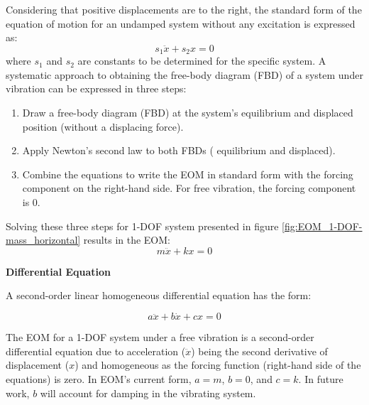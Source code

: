 \documentclass[12pt,letter]{article}
\begin{document}
		\pagebreak
		Considering that positive displacements are to the right, the standard form of the equation of motion for an undamped system without any excitation is expressed as:  
		\begin{equation}
			s_1 \ddot{x} + s_2 x = 0
		\end{equation}			
		where $s_1$ and $s_2$ are constants to be determined for the specific system. A systematic approach to obtaining the free-body diagram (FBD) of a system under vibration can be expressed in three steps:
		\begin{enumerate}
			\item Draw a free-body diagram (FBD) at the system's equilibrium and displaced position (without a displacing force).
			\item Apply Newton's second law to both FBDs ( equilibrium and displaced).
			\item Combine the equations to write the EOM in standard form with the forcing component on the right-hand side. For free vibration, the forcing component is 0. 
		\end{enumerate}
			
		Solving these three steps for 1-DOF system presented in figure \ref{fig:EOM_1-DOF-mass_horizontal} results in the EOM:
		\begin{equation}
			m \ddot{x} + k x = 0
		\end{equation}

		\begin{review}

			\textbf{Differential Equation}

			\noindent A second-order linear homogeneous differential equation has the form:
			
			\begin{equation}
			 a \ddot{x} + b \dot{x} + cx = 0
			\end{equation}
		
			\noindent The EOM for a 1-DOF system under a free vibration is a second-order differential equation due to acceleration ($\ddot{x}$) being the second derivative of displacement ($x$) and homogeneous as the forcing function (right-hand side of the equations) is zero. In EOM's current form, $a=m$, $b=0$,  and $c=k$. In future work, $b$ will account for damping in the vibrating system.     
		\end{review}
\end{document}
